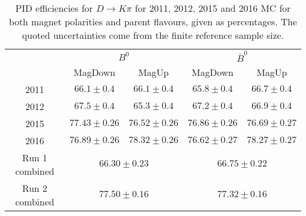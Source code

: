 \begin{table}[H]
    \centering
    \begin{tabular}{ccccc}
        \toprule
        & \multicolumn{2}{c}{$B^0$} &  \multicolumn{2}{c}{$\bar{B}^0$}\\
        & MagDown & MagUp & MagDown & MagUp\\
        \midrule
2011 & $66.1 \pm 0.4$ & $66.1 \pm 0.4$ & $65.8 \pm 0.4$ & $66.7 \pm 0.4$ \\
2012 & $67.5 \pm 0.4$ & $65.3 \pm 0.4$ & $67.2 \pm 0.4$ & $66.9 \pm 0.4$ \\
2015 & $77.43 \pm 0.26$ & $76.52 \pm 0.26$ & $76.86 \pm 0.26$ & $76.69 \pm 0.27$ \\
2016 & $76.89 \pm 0.26$ & $78.32 \pm 0.26$ & $76.62 \pm 0.27$ & $78.27 \pm 0.27$ \\
        \midrule
Run 1 combined & \multicolumn{2}{c}{$66.30 \pm 0.23$} & \multicolumn{2}{c}{$66.75 \pm 0.22$} \\
Run 2 combined & \multicolumn{2}{c}{$77.50 \pm 0.16$} & \multicolumn{2}{c}{$77.32 \pm 0.16$} \\
        \bottomrule
    \end{tabular}
    \caption{PID efficiencies for $D \to K\pi$ for 2011, 2012, 2015 and 2016 MC for both magnet polarities and parent flavours, given as percentages. The quoted  uncertainties come from the finite reference sample size.}
\label{tab:PID_efficiency_Kpi}
\end{table}

